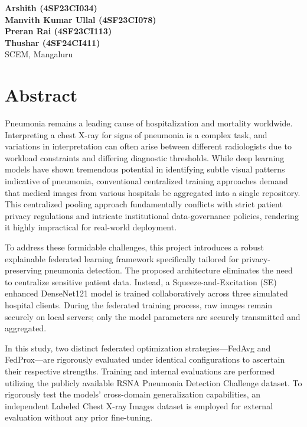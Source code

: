 \documentclass[12pt,a4paper]{report}
\begin{document}
\vspace{0.25in}
\begin{flushright}
\textbf{Arshith (4SF23CI034)}\\
\textbf{Manvith Kumar Ullal (4SF23CI078)}\\
\textbf{Preran Rai (4SF23CI113)}\\
\textbf{Thushar (4SF24CI411)}\\
SCEM, Mangaluru
\end{flushright}

\newpage
\pagestyle{plain}

\chapter*{Abstract}

Pneumonia remains a leading cause of hospitalization and mortality worldwide. Interpreting a chest X-ray for signs of pneumonia is a complex task, and variations in interpretation can often arise between different radiologists due to workload constraints and differing diagnostic thresholds. While deep learning models have shown tremendous potential in identifying subtle visual patterns indicative of pneumonia, conventional centralized training approaches demand that medical images from various hospitals be aggregated into a single repository. This centralized pooling approach fundamentally conflicts with strict patient privacy regulations and intricate institutional data-governance policies, rendering it highly impractical for real-world deployment.

To address these formidable challenges, this project introduces a robust explainable federated learning framework specifically tailored for privacy-preserving pneumonia detection. The proposed architecture eliminates the need to centralize sensitive patient data. Instead, a Squeeze-and-Excitation (SE) enhanced DenseNet121 model is trained collaboratively across three simulated hospital clients. During the federated training process, raw images remain securely on local servers; only the model parameters are securely transmitted and aggregated.

In this study, two distinct federated optimization strategies---FedAvg and FedProx---are rigorously evaluated under identical configurations to ascertain their respective strengths. Training and internal evaluations are performed utilizing the publicly available RSNA Pneumonia Detection Challenge dataset. To rigorously test the models' cross-domain generalization capabilities, an independent Labeled Chest X-ray Images dataset is employed for external evaluation without any prior fine-tuning.
\end{document}
